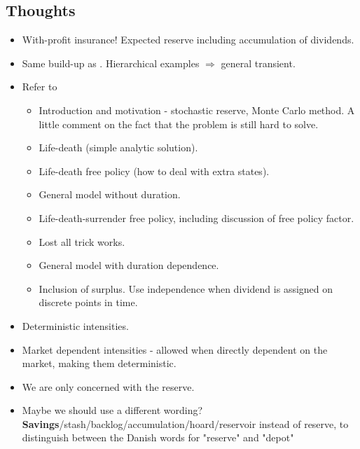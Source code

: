 \documentclass[12pt]{article}
\begin{document}
\subsection*{Thoughts}
\begin{itemize}
\item With-profit insurance! Expected reserve including accumulation of dividends.
\item Same build-up as \citet{THM_BUC}. Hierarchical examples $\Rightarrow$ general transient.
\item Refer to \citet{Norberg}
\begin{itemize}
\item Introduction and motivation - stochastic reserve, Monte Carlo method. A little comment on the fact that the problem is still hard to solve.
\item Life-death (simple analytic solution).
\item Life-death free policy (how to deal with extra states).
\item General model without duration.
\item Life-death-surrender free policy, including discussion of free policy factor.
\item Lost all trick works.
\item General model with duration dependence.
\item Inclusion of surplus. Use independence when dividend is assigned on discrete points in time.
\end{itemize}
\item Deterministic intensities.
\item Market dependent intensities - allowed when directly dependent on the market, making them deterministic.
\item We are only concerned with the reserve.
\item Maybe we should use a different wording? \textbf{Savings}/stash/backlog/accumulation/hoard/reservoir instead of reserve, to distinguish between the Danish words for "reserve" and "depot"
\end{itemize}


\newpage


\end{document}
